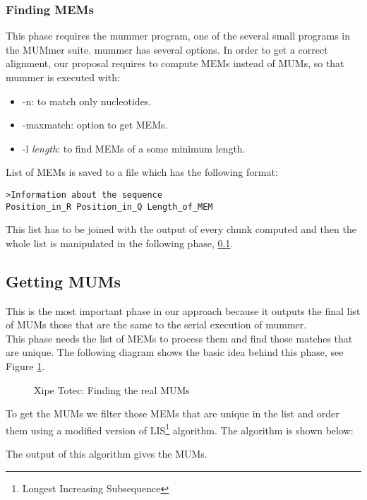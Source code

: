 \documentclass[10pt]{bmc_article}
\newenvironment{bmcformat}{\begin{raggedright}\baselineskip20pt\sloppy\setboolean{publ}{false}}{\end{raggedright}\baselineskip20pt\sloppy}
\begin{document}
\begin{bmcformat}
\subsubsection*{Finding MEMs}
This phase requires the mummer program, one of the several small programs in the MUMmer suite. mummer has several options.
In order to get a correct alignment, our proposal requires to compute MEMs instead of MUMs, so that mummer is executed with:
\begin{itemize}
  \item -n: to match only nucleotides.
  \item -maxmatch: option to get MEMs.
  \item -l \emph{length}: to find MEMs of a some minimum length.
\end{itemize}
List of MEMs is saved to a file which has the following format:
\begin{verbatim}
>Information about the sequence
Position_in_R Position_in_Q Length_of_MEM
\end{verbatim}
This list has to be joined with the output of every chunk computed and then the whole list is  manipulated in the following phase, \ref{getting}.
\subsection{Getting MUMs}
\label{getting}
This is the most important phase in our approach because it outputs the final list of MUMs those that are the same to the serial execution of mummer.\\
This phase needs the list of MEMs to process them and find those matches that are unique. The following diagram shows the basic idea behind this phase, see Figure \ref{xt}.
\begin{figure}[htb]  
 \begin{center} 
 \end{center} 
 \caption{Xipe Totec: Finding the real MUMs} 
   \label{xt} 
\end{figure}
To get the MUMs we filter those MEMs that are unique in the list and order them using a modified version of LIS\footnote{Longest Increasing Subsequence} algorithm.
The algorithm is shown below:
\begin{algorithmic}
\ELSE {}
\ENDIF
\ENDFOR
{}
\ELSE {}
\ENDIF
\ENDFOR
\end{algorithmic}
The output of this algorithm gives the MUMs.

\end{bmcformat}
\end{document}
